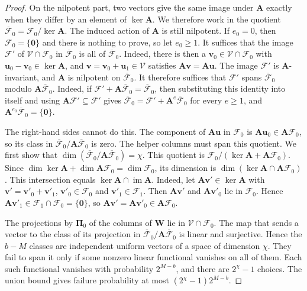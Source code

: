 \documentclass[b5paper, 10pt, abstract=true, captions=tableheading]{scrartcl}
\theoremstyle{plain}
\theoremstyle{definition}
\renewcommand{\vec}[1]{\symbf{#1}}
\newcommand{\mat}[1]{\symbf{#1}}
\begin{document}
\begin{proof}
On the nilpotent part, two vectors give the same image under $\mat A$
exactly when they differ by an element of $\ker\mat A$. We therefore work
in the quotient $\overline{\mathcal F}_0=\mathcal F_0/\ker\mat A$.
The induced action of $\mat A$ is still nilpotent. If $e_0=0$, then $\mathcal F_0=\{\vec 0\}$ and there is
nothing to prove, so let $e_0\geq1$. It suffices that the image
$\mathcal F'$ of $\mathcal V\cap\mathcal F_0$ in $\overline{\mathcal F}_0$
is all of $\overline{\mathcal F}_0$. Indeed, there is then a
$\vec v_0\in\mathcal V\cap\mathcal F_0$ with
$\vec u_0-\vec v_0\in\ker\mat A$, and $\vec v=\vec v_0+\vec u_1\in\mathcal
V$ satisfies $\mat A\vec v=\mat A\vec u$. The image $\mathcal F'$ is
$\mat A$-invariant, and $\mat A$ is nilpotent on
$\overline{\mathcal F}_0$. It therefore suffices that $\mathcal F'$ spans
$\overline{\mathcal F}_0$ modulo $\mat A\overline{\mathcal F}_0$. Indeed,
if $\mathcal F'+\mat A\overline{\mathcal F}_0=\overline{\mathcal F}_0$,
then substituting this identity into itself and using
$\mat A\mathcal F'\subseteq\mathcal F'$ gives
$\overline{\mathcal F}_0=\mathcal F'+\mat A^e\overline{\mathcal F}_0$ for
every $e\geq1$, and $\mat A^{e_0}\overline{\mathcal F}_0=\{\vec 0\}$.

The right-hand sides cannot do this. The component of $\mat A\vec u$ in
$\mathcal F_0$ is $\mat A\vec u_0\in\mat A\mathcal F_0$, so its class in
$\overline{\mathcal F}_0/\mat A\overline{\mathcal F}_0$ is zero. The
helper columns must span this quotient. We first show that
$\dim(\overline{\mathcal F}_0/\mat A\overline{\mathcal F}_0)=\chi$. This
quotient is $\mathcal F_0/(\ker\mat A+\mat A\mathcal F_0)$. Since
$\dim\ker\mat A+\dim\mat A\mathcal F_0=\dim\mathcal F_0$, its dimension is
$\dim(\ker\mat A\cap\mat A\mathcal F_0)$. This intersection equals
$\ker\mat A\cap\operatorname{im}\mat A$. Indeed, let
$\mat A\vec v'\in\ker\mat A$ with $\vec v'=\vec v'_0+\vec v'_1$,
$\vec v'_0\in\mathcal F_0$ and $\vec v'_1\in\mathcal F_1$. Then
$\mat A\vec v'$ and $\mat A\vec v'_0$ lie in $\mathcal F_0$. Hence
$\mat A\vec v'_1\in\mathcal F_1\cap\mathcal F_0=\{\vec 0\}$, so
$\mat A\vec v'=\mat A\vec v'_0\in\mat A\mathcal F_0$.

The projections by $\mat\Pi_0$ of the columns of $\mat W$ lie in
$\mathcal V\cap\mathcal F_0$. The map that sends a vector to the class of
its projection in
$\overline{\mathcal F}_0/\mat A\overline{\mathcal F}_0$ is linear and
surjective. Hence the $b-M$ classes are independent uniform vectors of a
space of dimension $\chi$. They fail to span it only if some nonzero
linear functional vanishes on all of them. Each such functional vanishes
with probability $2^{M-b}$, and there are $2^\chi-1$ choices. The union
bound gives failure probability at most $(2^\chi-1)2^{M-b}$.
\end{proof}
\end{document}

